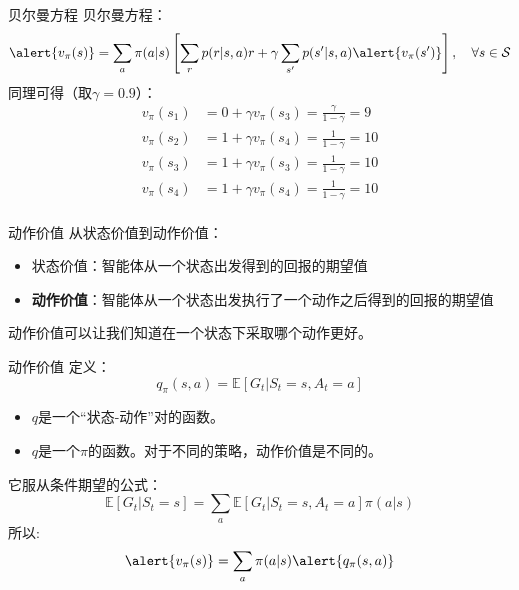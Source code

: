 \documentclass[aspectratio=169,xcolor=dvipsnames]{beamer}
\begin{document}
\begin{frame}{贝尔曼方程}
    贝尔曼方程：
    \[
        \alert{v_\pi(s)}=\sum_a\pi(a|s)\left[\sum_r p(r|s,a)r+\gamma\sum_{s'}p(s'|s,a)\alert{v_{\pi}(s')}\right], \quad \forall s\in\mathcal{S}
    \]
    同理可得（取$\gamma=0.9$）：
    \[
        \begin{aligned}
            v_\pi(s_1)&=0+\gamma v_\pi(s_3)=\frac{\gamma}{1-\gamma}=9 \\
            v_\pi(s_2)&=1+\gamma v_\pi(s_4)=\frac{1}{1-\gamma}=10 \\
            v_\pi(s_3)&=1+\gamma v_\pi(s_3)=\frac{1}{1-\gamma}=10 \\
            v_\pi(s_4)&=1+\gamma v_\pi(s_4)=\frac{1}{1-\gamma}=10\\
        \end{aligned}
    \]

\end{frame}

\begin{frame}{动作价值}
    从状态价值到动作价值：
    \begin{itemize}
        \item 状态价值：智能体从一个状态出发得到的回报的期望值
        \item \textbf{动作价值}：智能体从一个状态出发执行了一个动作之后得到的回报的期望值
    \end{itemize}
    动作价值可以让我们知道在一个状态下采取哪个动作更好。
\end{frame}

\begin{frame}{动作价值}
    定义：
    \[
        q_\pi(s,a)=\mathbb{E}[G_t|S_t=s,A_t=a]
    \]
    \begin{itemize}
        \item $q$是一个“状态-动作”对的函数。
        \item $q$是一个$\pi$的函数。对于不同的策略，动作价值是不同的。
    \end{itemize}
    它服从条件期望的公式：
    \begin{equation}
        \mathbb{E}[G_t|S_t=s]=\sum_a\mathbb{E}[G_t|S_t=s,A_t=a]\pi(a|s)
    \end{equation}
    所以:
    \begin{equation}
        \alert{v_\pi(s)}=\sum_a \pi(a|s)\alert{q_\pi(s,a)}
    \end{equation}
\end{frame}
\end{document}
